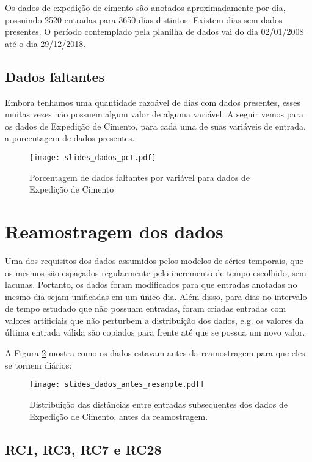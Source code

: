 Os dados de expedição de cimento são anotados aproximadamente por dia, possuindo 2520
entradas para 3650 dias distintos. Existem dias sem dados presentes. O
período contemplado pela planilha de dados vai do dia 02/01/2008 até o dia 29/12/2018.

\subsection{Dados faltantes}

Embora tenhamos uma quantidade razoável de dias com dados presentes, esses muitas vezes não possuem algum valor de alguma variável.
A seguir vemos para os dados de Expedição de Cimento, para cada uma de suas variáveis de entrada, a porcentagem de dados presentes. 


\begin{figure}[H]
  \centering
  \texttt{[image: slides\_dados\_pct.pdf]}
  \caption{Porcentagem de dados faltantes por variável para dados de Expedição de Cimento}
  \label{fig:dadosfalta}
\end{figure}


\section{Reamostragem dos dados}

Uma dos requisitos dos dados assumidos pelos modelos de séries temporais, que os mesmos
são espaçados regularmente pelo incremento de tempo escolhido, sem lacunas.
Portanto, os dados foram modificados para que entradas anotadas no mesmo dia
sejam unificadas em um único dia. Além disso, para dias no intervalo de tempo
estudado que não possuam entradas, foram criadas entradas com valores
artificiais que não perturbem a distribuição dos dados, e.g. os valores da
última entrada válida são copiados para frente até que se possua um novo valor.

A Figura \ref{fig:reamos} mostra como os dados estavam antes da reamostragem
para que eles se tornem diários: 

\begin{figure}[H]
  \centering
  \texttt{[image: slides\_dados\_antes\_resample.pdf]}
  \caption{Distribuição das distâncias entre entradas subsequentes dos dados de Expedição de Cimento, antes da reamostragem.}
  \label{fig:reamos}
\end{figure}



\subsection{RC1, RC3, RC7 e RC28}

